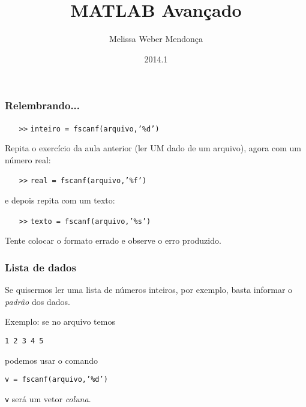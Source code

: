 \documentclass{beamer}
\title{MATLAB Avançado}
\author[M. Weber Mendonça]{Melissa Weber Mendonça}
\institute[UFSC]{\inst{1} Universidade Federal de Santa Catarina}
\date{2014.1}
\newcommand{\code}[1]{{\texttt{#1}}}
\newcommand{\acode}[1]{\alert{\texttt{#1}}}
\newcommand{\ac}{\alert{\texttt{>>}}}
\newcommand{\file}[3]{\texttt{
   \begin{center}
      \begin{tikzpicture}
         \node[mybox] (box) {
            \begin{minipage}{#1}
               #3
            \end{minipage}
         };
         \node[draw, fill=white, text=black, right=10pt, rounded corners] at (box.north west) {
            \textbf{#2}
         };
      \end{tikzpicture}
   \end{center}}
}
\begin{document}
\begin{frame}
  \titlepage
\end{frame}
\begin{frame}
   \frametitle{Relembrando...}
   \begin{itemize}
      \item[\ac] \code{inteiro = \acode{fscanf}(arquivo,’\%d’)}
   \end{itemize}
   Repita o exercício da aula anterior (ler UM dado de um arquivo), agora com um número real:
   \begin{itemize}
      \item[\ac] \code{real = \acode{fscanf}(arquivo,’\%f’)}
   \end{itemize}
   e depois repita com um texto:
   \begin{itemize}
      \item[\ac] \code{texto = \acode{fscanf}(arquivo,’\%s’)}
   \end{itemize}
   \vfill
   Tente colocar o formato errado e observe o erro produzido.
\end{frame}
\begin{frame}
   \frametitle{Lista de dados}
   Se quisermos ler uma lista de números inteiros, por exemplo, basta informar o \emph{padrão} dos dados. 

   Exemplo: se no arquivo temos
   \begin{center}
      \code{1 2 3 4 5}
   \end{center}
   podemos usar o comando
   \begin{center}
      \code{v = \acode{fscanf}(arquivo,'\%d')}
   \end{center}
   \code{v} será um vetor \emph{coluna}. 
\end{frame}
\end{document}
